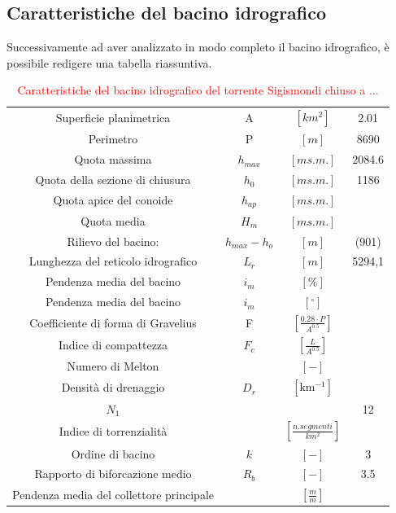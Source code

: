 \subsection{Caratteristiche del bacino idrografico}
Successivamente ad aver analizzato in modo completo il bacino idrografico, è possibile redigere una tabella riassuntiva.
\begin{table}[H] \centering
    \caption{\textcolor{red}{Caratteristiche del bacino idrografico  del torrente Sigismondi chiuso a ...}}
    \label{tab:caratteristiche_bacino}
    \begin{tabular}{ cccc } 
    \toprule
    Superficie planimetrica & A &  $\left[km^2\right]$ & 2.01 \\ 
    Perimetro & P & $\left[m\right]$        &      8690       \\ 
    Quota massima & $h_{max}$&  $\left[m s.m.\right]$       &    2084.6     \\
    Quota della sezione di chiusura & $h_0$ & $\left[m s.m.\right]$        &       1186      \\ 
    Quota apice del conoide &$h_{ap}$& $\left[m s.m.\right]$ & \\ 
    Quota media& $H_m$ & $\left[m s.m.\right]$ & \\ 
    Rilievo del bacino:& $h_{max} - h_o$ & $\left[m\right]$ &   (901) \\ 
    Lunghezza del reticolo idrografico& $L_r$& $\left[m\right]$ & 5294,1 \\ 
    Pendenza media del bacino& $i_m$ & $\left[\%\right]$ & \\ 
    Pendenza media del bacino& $i_m$& $\left[ ^\circ \right]$ & \\ 
    Coefficiente di forma di Gravelius& F& $\left[\frac{0.28 \cdot P}{A^{0.5}} \right]$ & \\  
    Indice di compattezza &$F_c$  & $ \left[\frac{L}{A^{0.5}}\right]$ & \\ 
    Numero di Melton& & $\left[-\right]$ & \\ 
    Densità di drenaggio &$D_r$& $\left[\si{\km^{-1}}\right]$& \\ 
    $N_1$& & & 12 \\ 
    Indice di torrenzialità& &$\left[\frac{n. segmenti }{km^2}\right]$ & \\  
    Ordine di bacino& $k$ & $\left[-\right]$ & 3 \\ 
    Rapporto di biforcazione medio& $R_b$ & $\left[-\right]$ &  3.5 \\  
    Pendenza media del collettore principale & & $\left[\frac{m}{m}\right]$ & \\  
    \bottomrule
\end{tabular}
\end{table}
